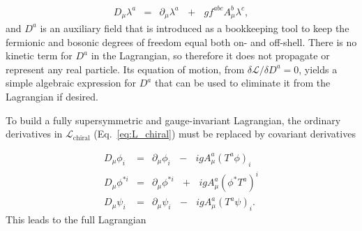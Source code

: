 \documentclass[dissertation.tex]{subfiles}
\begin{document}
\begin{eqnarray}
\label{eq:gaugino_covariant_derivative}
D_{\mu}\lambda^{a} &=& \partial_{\mu}\lambda^{a}\mbox{ }+\mbox{ }gf^{abc}A_{\mu}^{b}\lambda^{c}, 
\end{eqnarray}
%
and $D^{a}$ is an auxiliary field that is introduced as a bookkeeping tool to keep the fermionic and bosonic degrees of freedom equal both on- and off-shell.  There is no kinetic term for $D^{a}$ in the Lagrangian, so therefore it does not propagate or represent any real particle.  Its equation of motion, from $\delta\mathcal{L}/\delta D^{a} = 0$, yields a simple algebraic expression for $D^{a}$ that can be used to eliminate it from the Lagrangian if desired.

To build a fully supersymmetric and gauge-invariant Lagrangian, the ordinary derivatives in $\mathcal{L}_{\mathrm{chiral}}$ (Eq.~\ref{eq:L_chiral}) must be replaced by covariant derivatives

\begin{eqnarray}
\label{eq:fermion_sfermion_covariant_derivatives}
D_{\mu}\phi_{i} &=& \partial_{\mu}\phi_{i}\mbox{ }-\mbox{ }igA_{\mu}^{a}(T^{a}\phi)_{i}\\
D_{\mu}\phi^{*i} &=& \partial_{\mu}\phi^{*i}\mbox{ }+\mbox{ }igA_{\mu}^{a}(\phi^{*}T^{a})^{i}\\
D_{\mu}\psi_{i} &=& \partial_{\mu}\psi_{i}\mbox{ }-\mbox{ }igA_{\mu}^{a}(T^{a}\psi)_{i}.
\end{eqnarray}
%
This leads to the full Lagrangian
\end{document}
